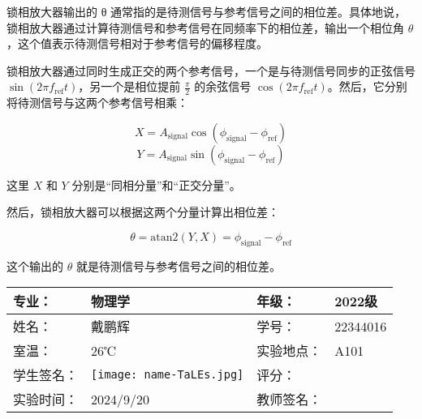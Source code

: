 \documentclass[dvipsnames, svgnames,a4paper,11pt]{article}
\begin{document}
锁相放大器输出的 θ 通常指的是待测信号与参考信号之间的相位差。具体地说，锁相放大器通过计算待测信号和参考信号在同频率下的相位差，输出一个相位角 \( \theta \)，这个值表示待测信号相对于参考信号的偏移程度。

锁相放大器通过同时生成正交的两个参考信号，一个是与待测信号同步的正弦信号 \( \sin(2\pi f_{\text{ref}} t) \)，另一个是相位提前 \( \frac{\pi}{2} \) 的余弦信号 \( \cos(2\pi f_{\text{ref}} t) \)。然后，它分别将待测信号与这两个参考信号相乘：

\[
X = A_{\text{signal}} \cos(\phi_{\text{signal}} - \phi_{\text{ref}})
\]
\[
Y = A_{\text{signal}} \sin(\phi_{\text{signal}} - \phi_{\text{ref}})
\]

这里 \( X \) 和 \( Y \) 分别是“同相分量”和“正交分量”。

然后，锁相放大器可以根据这两个分量计算出相位差：

\[
\theta = \text{atan2}(Y, X) = \phi_{\text{signal}} - \phi_{\text{ref}}
\]

这个输出的 \( \theta \) 就是待测信号与参考信号之间的相位差。














\clearpage
\begin{table}
	\renewcommand\arraystretch{1.7}
	\centering
	\begin{tabularx}{\textwidth}{|X|X|X|X|}
	\hline
	专业：& 物理学 &年级：& 2022级 \\
	\hline
	姓名：& 戴鹏辉 & 学号：& 22344016 \\
	\hline
	室温：& 26℃ & 实验地点： & A101 \\
	\hline
	学生签名：& \texttt{[image: name-TaLEs.jpg]} & 评分： &\\
	\hline
	实验时间：& 2024/9/20 & 教师签名：&\\
	\hline
	\end{tabularx}
\end{table}
\end{document}
